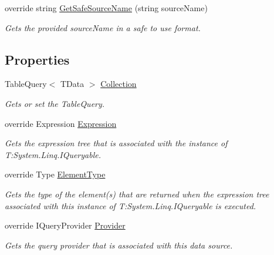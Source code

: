 \begin{DoxyCompactItemize}
override string \hyperlink{classCqrs_1_1Azure_1_1BlobStorage_1_1TableStorageStore_a7b9e49aa8017ff3c55b184b956a150d0_a7b9e49aa8017ff3c55b184b956a150d0}{Get\+Safe\+Source\+Name} (string source\+Name)
\begin{DoxyCompactList}\small\item\em Gets the provided {\itshape source\+Name}  in a safe to use format. \end{DoxyCompactList}\end{DoxyCompactItemize}
\subsection*{Properties}
\begin{DoxyCompactItemize}
\item 
Table\+Query$<$ T\+Data $>$ \hyperlink{classCqrs_1_1Azure_1_1BlobStorage_1_1TableStorageStore_a97752ec9c5ad130a230924da9a75a537_a97752ec9c5ad130a230924da9a75a537}{Collection}
\begin{DoxyCompactList}\small\item\em Gets or set the Table\+Query. \end{DoxyCompactList}\item 
override Expression \hyperlink{classCqrs_1_1Azure_1_1BlobStorage_1_1TableStorageStore_af7d55541709a0519bdb0b5d201c5a97c_af7d55541709a0519bdb0b5d201c5a97c}{Expression}
\begin{DoxyCompactList}\small\item\em Gets the expression tree that is associated with the instance of T\+:\+System.\+Linq.\+I\+Queryable. \end{DoxyCompactList}\item 
override Type \hyperlink{classCqrs_1_1Azure_1_1BlobStorage_1_1TableStorageStore_a57e68c383098e81303eeebe0b85c970c_a57e68c383098e81303eeebe0b85c970c}{Element\+Type}
\begin{DoxyCompactList}\small\item\em Gets the type of the element(s) that are returned when the expression tree associated with this instance of T\+:\+System.\+Linq.\+I\+Queryable is executed. \end{DoxyCompactList}\item 
override I\+Query\+Provider \hyperlink{classCqrs_1_1Azure_1_1BlobStorage_1_1TableStorageStore_a95c1b0fce651992dd6bd75f44da15829_a95c1b0fce651992dd6bd75f44da15829}{Provider}
\begin{DoxyCompactList}\small\item\em Gets the query provider that is associated with this data source. \end{DoxyCompactList}\end{DoxyCompactItemize}



